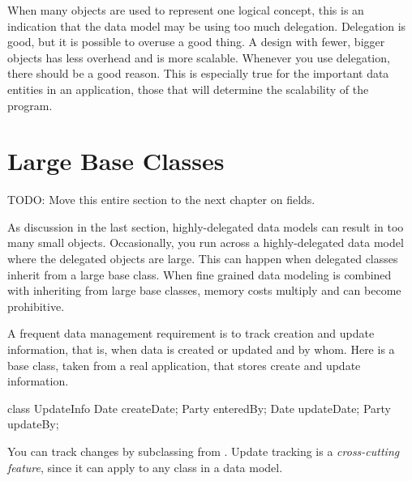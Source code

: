 When many objects are used to represent one logical concept, this is an indication that the data model may be using too much delegation. Delegation is good, but it is possible to overuse a good thing.  A design with fewer, bigger objects has less overhead and is more scalable. Whenever you use delegation, there should be a good reason. This is especially true for the important data entities in an application, those that will determine the scalability of the program.  
 

\section{Large Base Classes}

TODO: Move this entire section to the next chapter on fields. 

As discussion in the last section, highly-delegated data models can result in too many small objects. Occasionally, you run across a highly-delegated data model where the delegated objects are large. This can happen when delegated classes inherit from a large base class. When fine grained data modeling is combined with inheriting from large base classes, memory costs multiply and can become prohibitive. 

A frequent data management requirement is to track creation and update information, that is, when data is created or updated and by whom.  Here is a base class, taken from a real application, that stores create and update information.  
\begin{shortlisting}
class UpdateInfo {
     Date createDate;
     Party enteredBy;
     Date updateDate;
     Party updateBy;
}
\end{shortlisting}
You can track changes by subclassing from . Update tracking is
a \textit{cross-cutting feature}, since it can apply to any class in a data model.

